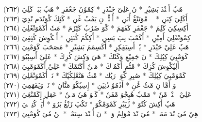 \documentclass[a4paper, 10pt]{report}
\begin{document}
\begin{center}
\textarabic{(٢٦٢) \textcolor{mygreen}{هَپٗ أَكٖنْدَ بَشِيْرِ  * نَ عَلِىْ حَىْدَرِ  * كِمْوٗنَ جَعْفَرِ  * هَپٗ بَبَكٖ كَلِيَ }} 
\\[5mm] 

\textarabic{(٢٦٣) \textcolor{mygreen}{أَكَلِيَ كِبَنِ  * إٖوٖ مْوَنَنْڠُ أُنَنِ  * أُپٖٹْوٖ نِ يَمْبٗ ڠَنِ  * كَٹِكَ كْوَنْدَم نْدِيَ }} 
\\[5mm] 

\textarabic{(٢٦٤) \textcolor{mygreen}{أَكِسِكِيَ كَلِمَ  * جَعْفَرِ كَفَهَمَ  * كْوَ ضَرُبُ كَٹِزَمَ  * مَتٗ أَكَمْوَنْڠَلِيَ }} 
\\[5mm] 

\textarabic{(٢٦٥) \textcolor{mygreen}{كِمْوَنْڠَلِيَ أَمِيْنِ  * أَكَمْبَ نِپَ يَسِنِ  * أَكِكٗمَ كُبَئِنِ  * أَمٖكْوِشَ كُئِفِيَ }} 
\\[5mm] 

\textarabic{(٢٦٦) \textcolor{mygreen}{هَپٗ عَلِيْ حَيْدَرِ  * يٗتٖ أَسِيَفِكِرِ  * أَكَسِمَمَ بَشِيْرِ  * مَصَحَبَ كَوَمْبِيَ }} 
\\[5mm] 

\textarabic{(٢٦٧) \textcolor{mygreen}{كَوَمْبِيَ كِپُلِكَ  * نَ جَمِيْعِ وَكَتٗكَ  * هَيَ وَكِشَ كُزِكَ  * عَلِيْ أَسِپٗيُوَ }} 
\\[5mm] 

\textarabic{(٢٦٨) \textcolor{mygreen}{أَلِپٗكْوِشَ كُزِكَ  * مْٹُمِ أَكَمُوٖكَ  * مَنٖنٗ أَكَتَمْكَ  * عَلِيْ أَكَمْوَمْبِيَ }} 
\\[5mm] 

\textarabic{(٢٦٩) \textcolor{mygreen}{كَمْوَمْبِيَ كِپُلِكَ  * صُبِرِ كْوَكٖ رَبُك  * مْٹُ هَنْڠَلِكُپٗكَ  * نَوٖ أُكَمْوَنْڠَلِيَ }} 
\\[5mm] 

\textarabic{(٢٧٠) \textcolor{mygreen}{وَ أَمَّا نِ مْٹُ ڠَنِ  * أَدُمُوٗ دُنِيَنِ  * إِسِپٗكُوَ مَنَّانِ  * نَوٖ وَيَفَهَمِيَ }} 
\\[5mm] 

\textarabic{(٢٧١) \textcolor{mygreen}{عَلِيْ سٖنٖنْدٖ مْنٗ  * مَمْبٗ هُپِجْوَ مْفَنٗ  * كَپٖوَ هَيٗ مَنٖنٗ  * عَقِلِ إِكَمْنْڠِيَ }} 
\\[5mm] 

\textarabic{(٢٧٢) \textcolor{mygreen}{هَپٗ أَكِشَ كُتٗوَ  * زُبَيْرِ كَمْوَمْكُوَ  * تَكُپَ زَنْڠُ بَرُوَ  * أُپَٹٖ كُنِپٖكٖيَ }} 
\\[5mm] 

\textarabic{(٢٧٣) \textcolor{mygreen}{هِيْ مٗيَ نْدَ مَمَكٖ  * مٗيَ نْدَ مْوَلِمُ وَكٖ  * نَ أُچٖنْدَ سِتَمْكٖ  * نٖنٗ مٗيَ كُوَمْبِيَ }} 
\\[5mm] 


\end{center}
\end{document}
